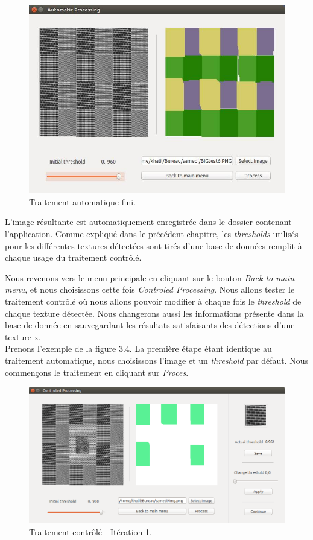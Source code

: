 \begin{figure}[H]
	\centering
		\includegraphics[width=12cm,]{Figures/chap3/5.jpg}
	\caption[traitementAutofin]{Traitement automatique fini.}
	\label{fig:traitementAutofin}
\end{figure}

\indent L'image résultante est automatiquement enregistrée dans le dossier contenant l'application. Comme expliqué dans le précédent chapitre, les \textit{thresholds} utilisés pour les différentes textures détectées sont tirés d'une base de données remplit à chaque usage du traitement contrôlé.

\indent Nous revenons vers le menu principale en cliquant sur le bouton \textit{Back to main menu}, et nous choisissons cette fois \textit{Controled Processing}.
Nous allons tester le traitement contrôlé où nous allons pouvoir modifier à chaque fois le \textit{threshold} de chaque texture détectée. Nous changerons aussi les informations présente dans la base de donnée en sauvegardant les résultats satisfaisants des détections d'une texture x.\\
\indent Prenons l'exemple de la figure 3.4. La première étape étant identique au traitement automatique, nous choisissons l'image et un \textit{threshold} par défaut. Nous commençons le traitement en cliquant sur \textit{Proces}.


\begin{figure}[H]
	\centering
		\includegraphics[width=15cm,]{Figures/chap3/Capture4343.png}
	\caption[traitementAutofin]{Traitement contrôlé - Itération 1.}
	\label{fig:traitementAutofin}
\end{figure}


